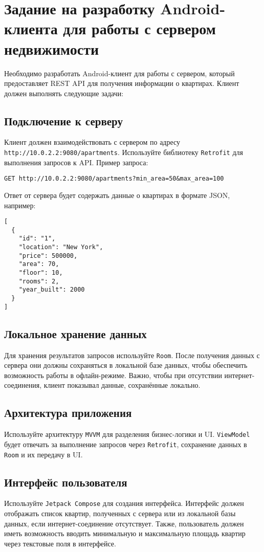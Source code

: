 \section{Задание на разработку Android-клиента для работы с сервером недвижимости}

Необходимо разработать Android-клиент для работы с сервером, который предоставляет REST API для получения информации о квартирах. Клиент должен выполнять следующие задачи:

\subsection{Подключение к серверу}
Клиент должен взаимодействовать с сервером по адресу \texttt{http://10.0.2.2:9080/apartments}. Используйте библиотеку \texttt{Retrofit} для выполнения запросов к API. Пример запроса:

\begin{verbatim}
GET http://10.0.2.2:9080/apartments?min_area=50&max_area=100
\end{verbatim}

Ответ от сервера будет содержать данные о квартирах в формате JSON, например:

\begin{verbatim}
[
  {
    "id": "1",
    "location": "New York",
    "price": 500000,
    "area": 70,
    "floor": 10,
    "rooms": 2,
    "year_built": 2000
  }
]
\end{verbatim}

\subsection{Локальное хранение данных}
Для хранения результатов запросов используйте \texttt{Room}. После получения данных с сервера они должны сохраняться в локальной базе данных, чтобы обеспечить возможность работы в офлайн-режиме. Важно, чтобы при отсутствии интернет-соединения, клиент показывал данные, сохранённые локально.

\subsection{Архитектура приложения}
Используйте архитектуру \texttt{MVVM} для разделения бизнес-логики и UI. \texttt{ViewModel} будет отвечать за выполнение запросов через \texttt{Retrofit}, сохранение данных в \texttt{Room} и их передачу в UI.

\subsection{Интерфейс пользователя}
Используйте \texttt{Jetpack Compose} для создания интерфейса. Интерфейс должен отображать список квартир, полученных с сервера или из локальной базы данных, если интернет-соединение отсутствует. Также, пользователь должен иметь возможность вводить минимальную и максимальную площадь квартир через текстовые поля в интерфейсе.


